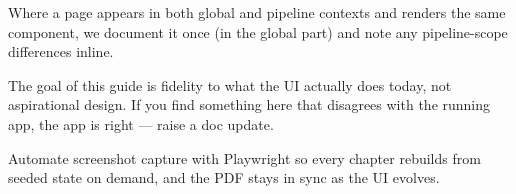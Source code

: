 Where a page appears in both global and pipeline contexts and renders the same
component, we document it once (in the global part) and note any pipeline-scope
differences inline.

\begin{designnote}
The goal of this guide is fidelity to what the UI actually does today, not
aspirational design. If you find something here that disagrees with the running
app, the app is right — raise a doc update.
\end{designnote}

\begin{futureidea}
Automate screenshot capture with Playwright so every chapter rebuilds from
seeded state on demand, and the PDF stays in sync as the UI evolves.
\end{futureidea}
